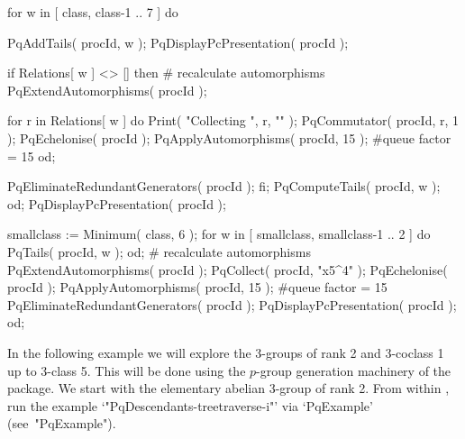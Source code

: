     for w in [ class, class-1 .. 7 ] do

        PqAddTails( procId, w );   
        PqDisplayPcPresentation( procId );

        if Relations[ w ] <> [] then
            # recalculate automorphisms
            PqExtendAutomorphisms( procId );

            for r in Relations[ w ] do
                Print( "Collecting ", r, "\n" );
                PqCommutator( procId, r, 1 );
                PqEchelonise( procId );
                PqApplyAutomorphisms( procId, 15 ); #queue factor = 15
            od;

            PqEliminateRedundantGenerators( procId );
        fi;   
        PqComputeTails( procId, w );
    od;
    PqDisplayPcPresentation( procId );

    smallclass := Minimum( class, 6 );
    for w in [ smallclass, smallclass-1 .. 2 ] do
        PqTails( procId, w );
    od;
    # recalculate automorphisms
    PqExtendAutomorphisms( procId );
    PqCollect( procId, "x5^4" );
    PqEchelonise( procId );
    PqApplyAutomorphisms( procId, 15 ); #queue factor = 15
    PqEliminateRedundantGenerators( procId );
    PqDisplayPcPresentation( procId );
od;
\endtt


In the following example we will explore  the  3-groups  of  rank  2  and
3-coclass 1 up to 3-class 5.  This  will  be  done  using  the  $p$-group
generation machinery of the package. We start with the elementary abelian
3-group   of   rank   2.   From   within   {\GAP},   run   the    example
`"PqDescendants-treetraverse-i"' via `PqExample' (see~"PqExample").

